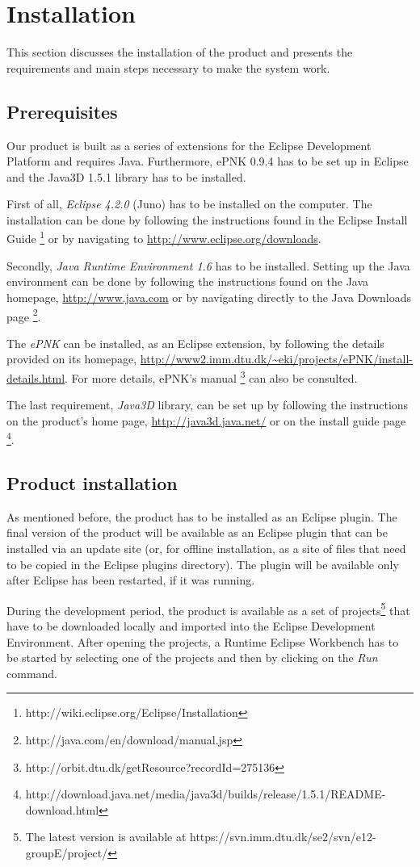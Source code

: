 \section{Installation}
\label{sec:installation}

This section discusses the installation of the product and presents the requirements and main steps
necessary to make the system work.

\subsection{Prerequisites}
Our product is built as a series of extensions for the Eclipse Development Platform and requires
Java. Furthermore, ePNK 0.9.4 has to be set up in Eclipse and the Java3D 1.5.1 library has to be
installed.

First of all, \textit{Eclipse 4.2.0} (Juno) has to be installed on the computer. The installation
can be done by following the instructions found in the Eclipse Install Guide
\footnote{http://wiki.eclipse.org/Eclipse/Installation} or by navigating to
\url{http://www.eclipse.org/downloads}.

Secondly, \textit{Java Runtime Environment 1.6} has to be installed. Setting up the Java
environment can be done by following the instructions found on the Java homepage,
\url{http://www.java.com} or by navigating directly to the Java Downloads page
\footnote{http://java.com/en/download/manual.jsp}.

The \textit{ePNK} can be installed, as an Eclipse extension, by following the details provided on
its homepage, \url{http://www2.imm.dtu.dk/~eki/projects/ePNK/install-details.html}. For more
details, ePNK's manual \footnote{http://orbit.dtu.dk/getResource?recordId=275136} can also be
consulted.

The last requirement, \textit{Java3D} library, can be set up by following the instructions on the
product's home page, \url{http://java3d.java.net/} or on the install guide page
\footnote{http://download.java.net/media/java3d/builds/release/1.5.1/README-download.html}.

\subsection{Product installation}
As mentioned before, the product has to be installed as an Eclipse plugin. The final version of
the product will be available as an Eclipse plugin that can be installed via an update 
site (or, for offline installation, as a site of files that need to be copied in the Eclipse plugins 
directory). The plugin will be available only after Eclipse has been restarted, if it was running.

During the development period, the product is available as a set of projects\footnote{The latest
version is available at https://svn.imm.dtu.dk/se2/svn/e12-groupE/project/} that have to be
downloaded locally and imported into the Eclipse Development Environment. After opening the projects, a
Runtime Eclipse Workbench has to be started by selecting one of the projects and then by clicking on
the \textit{Run} command.
